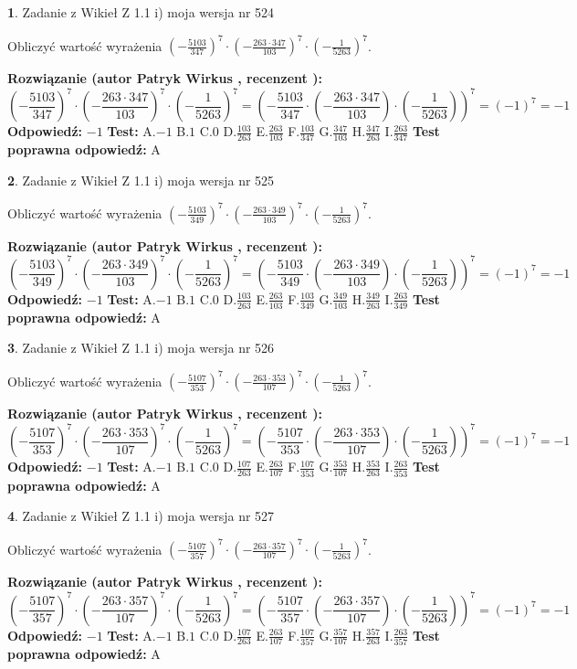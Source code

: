 \documentclass[12pt, a4paper]{article}
\theoremstyle{definition} %
\newtheorem{zad}{}
\newcommand{\zadStart}[1]{\begin{zad}#1\newline}
\newcommand{\zadStop}{\end{zad}}
\newcommand{\rozwStart}[2]{\noindent \textbf{Rozwiązanie (autor #1 , recenzent #2): }\newline}
\newcommand{\rozwStop}{\newline}
\newcommand{\odpStart}{\noindent \textbf{Odpowiedź:}\newline}
\newcommand{\odpStop}{\newline}
\newcommand{\testStart}{\noindent \textbf{Test:}\newline}
\newcommand{\testStop}{\newline}
\newcommand{\kluczStart}{\noindent \textbf{Test poprawna odpowiedź:}\newline}
\newcommand{\kluczStop}{\newline}
\begin{document}
\zadStart{Zadanie z Wikieł Z 1.1 i) moja wersja nr 524}

Obliczyć wartość wyrażenia $(-\frac{5103}{347})^{7} \cdot (-\frac{263 \cdot 347}{103})^{7} \cdot (-\frac{1}{5263})^{7}$.
\zadStop
\rozwStart{Patryk Wirkus}{}
$$(-\frac{5103}{347})^{7} \cdot (-\frac{263 \cdot 347}{103})^{7} \cdot (-\frac{1}{5263})^{7} = (-\frac{5103}{347} \cdot (-\frac{263 \cdot 347}{103}) \cdot (-\frac{1}{5263}))^{7} = (-1)^{7} = -1$$
\rozwStop
\odpStart
$-1$
\odpStop
\testStart
A.$-1$ B.$1$ C.$0$ D.$\frac{103}{263}$ E.$\frac{263}{103}$
F.$\frac{103}{347}$ G.$\frac{347}{103}$
H.$\frac{347}{263}$
I.$\frac{263}{347}$
\testStop
\kluczStart
A
\kluczStop



\zadStart{Zadanie z Wikieł Z 1.1 i) moja wersja nr 525}

Obliczyć wartość wyrażenia $(-\frac{5103}{349})^{7} \cdot (-\frac{263 \cdot 349}{103})^{7} \cdot (-\frac{1}{5263})^{7}$.
\zadStop
\rozwStart{Patryk Wirkus}{}
$$(-\frac{5103}{349})^{7} \cdot (-\frac{263 \cdot 349}{103})^{7} \cdot (-\frac{1}{5263})^{7} = (-\frac{5103}{349} \cdot (-\frac{263 \cdot 349}{103}) \cdot (-\frac{1}{5263}))^{7} = (-1)^{7} = -1$$
\rozwStop
\odpStart
$-1$
\odpStop
\testStart
A.$-1$ B.$1$ C.$0$ D.$\frac{103}{263}$ E.$\frac{263}{103}$
F.$\frac{103}{349}$ G.$\frac{349}{103}$
H.$\frac{349}{263}$
I.$\frac{263}{349}$
\testStop
\kluczStart
A
\kluczStop



\zadStart{Zadanie z Wikieł Z 1.1 i) moja wersja nr 526}

Obliczyć wartość wyrażenia $(-\frac{5107}{353})^{7} \cdot (-\frac{263 \cdot 353}{107})^{7} \cdot (-\frac{1}{5263})^{7}$.
\zadStop
\rozwStart{Patryk Wirkus}{}
$$(-\frac{5107}{353})^{7} \cdot (-\frac{263 \cdot 353}{107})^{7} \cdot (-\frac{1}{5263})^{7} = (-\frac{5107}{353} \cdot (-\frac{263 \cdot 353}{107}) \cdot (-\frac{1}{5263}))^{7} = (-1)^{7} = -1$$
\rozwStop
\odpStart
$-1$
\odpStop
\testStart
A.$-1$ B.$1$ C.$0$ D.$\frac{107}{263}$ E.$\frac{263}{107}$
F.$\frac{107}{353}$ G.$\frac{353}{107}$
H.$\frac{353}{263}$
I.$\frac{263}{353}$
\testStop
\kluczStart
A
\kluczStop



\zadStart{Zadanie z Wikieł Z 1.1 i) moja wersja nr 527}

Obliczyć wartość wyrażenia $(-\frac{5107}{357})^{7} \cdot (-\frac{263 \cdot 357}{107})^{7} \cdot (-\frac{1}{5263})^{7}$.
\zadStop
\rozwStart{Patryk Wirkus}{}
$$(-\frac{5107}{357})^{7} \cdot (-\frac{263 \cdot 357}{107})^{7} \cdot (-\frac{1}{5263})^{7} = (-\frac{5107}{357} \cdot (-\frac{263 \cdot 357}{107}) \cdot (-\frac{1}{5263}))^{7} = (-1)^{7} = -1$$
\rozwStop
\odpStart
$-1$
\odpStop
\testStart
A.$-1$ B.$1$ C.$0$ D.$\frac{107}{263}$ E.$\frac{263}{107}$
F.$\frac{107}{357}$ G.$\frac{357}{107}$
H.$\frac{357}{263}$
I.$\frac{263}{357}$
\testStop
\kluczStart
A
\kluczStop
\end{document}

